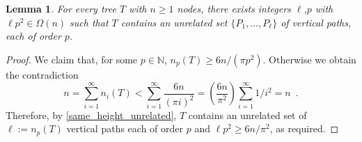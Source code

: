 \documentclass[lotsofwhite]{patmorin}
\newcommand{\N}{\mathbb{N}}
\renewcommand{\ge}{\geqslant}
\renewcommand{\le}{\leqslant}
\newcommand{\pat}[1]{\textcolor{Maroon}{PM: #1}}
\theoremstyle{plain}
\newtheorem{lem}[thm]{Lemma}
\theoremstyle{definition}
\begin{document}
\begin{lem}\label{newer_subdivided_star_minor}
  For every tree $T$ with $n \ge 1$ nodes, there exists integers $\ell$,$p$ with $\ell p^2 \in \Omega(n)$ such that $T$ contains an unrelated set $\{P_1,\ldots,P_\ell\}$ of vertical paths, each of order $p$.
\end{lem}

\begin{proof}
  We claim that, for some $p\in\N$, $n_p(T)\ge 6n/(\pi p^2)$. Otherwise we obtain the contradiction
  \[
    n = \sum_{i=1}^\infty n_i(T) < \sum_{i=1}^\infty \frac{6n}{(\pi i)^2} = \left(\frac{6n}{\pi^2}\right)\sum_{i=1}^\infty 1/i^2 = n \enspace .
  \]
  Therefore, by \cref{same_height_unrelated}, $T$ contains an unrelated set of $\ell:= n_p(T)$ vertical paths each of order $p$ and $\ell p^2\ge 6n/\pi^2$, as required.
%
%
%
%
%
%
\end{proof}
\end{document}
